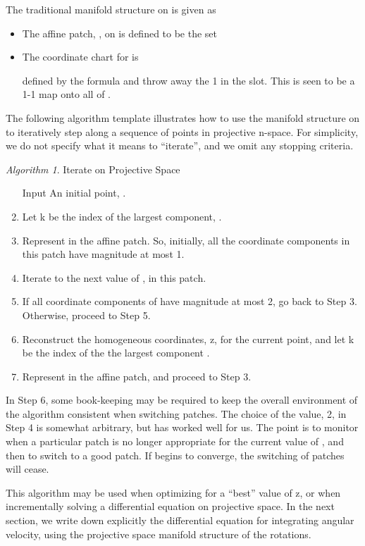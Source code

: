 \documentclass{gen-j-l}
\theoremstyle{definition}
\theoremstyle{remark}
\numberwithin{equation}{section}
\newtheorem{algorithm}{Algorithm}[section]
\begin{document}
The traditional manifold structure
on  is given as

\begin{itemize}
\item The  affine patch, ,  on  is defined to be the set

\item The coordinate chart for  is 

defined by the formula  and throw away the 1 in the  slot.
This is seen to be a 1-1 map onto all of .
\end{itemize}

The following algorithm template illustrates how to use the 
manifold structure on  to iteratively step along a sequence of points
in projective n-space.  For simplicity, we do not specify what it means
to ``iterate'', and we omit any stopping criteria.

\begin{algorithm}{Iterate on Projective Space} 
\begin{enumerate}
\item[ Input ] An initial point, .
\item Let k be the index of the largest component, .
\item Represent  in the  affine patch.  So, initially,
all the coordinate components in this patch have magnitude at most 1.
\item Iterate to the next value of , in this patch.
\item If all coordinate components of  have magnitude at most 2, 
go back to Step 3.  Otherwise, proceed to Step 5.
\item Reconstruct the homogeneous coordinates, z, for the current
point, and let k be the index of the the largest component .
\item Represent  in the  affine patch, and proceed
to Step 3.
\end{enumerate}
In Step 6, some book-keeping may be required to keep the overall
environment of the algorithm consistent when switching patches.  The
choice of the value, 2, in Step 4 is somewhat arbitrary, but has worked
well for us.  The point is to monitor when a particular patch is no longer
appropriate for the current value of , and then to switch to a good patch.
If  begins to converge, the switching of patches will cease.  
\end{algorithm}
This algorithm may be used when optimizing for a ``best'' value of z,
or when incrementally solving a differential equation on projective space.
In the next section, we write down explicitly the differential equation for
integrating angular velocity, using the projective space manifold structure
of the rotations.
\end{document}
